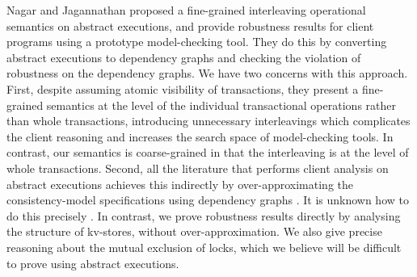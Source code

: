 {%

Nagar and Jagannathan \cite{sureshConcur} proposed a fine-grained 
interleaving operational semantics on abstract executions, and provide
robustness results for client programs using 
a prototype 
model-checking tool. 
They do this by converting abstract executions to
dependency graphs and checking the violation of robustness on the
dependency graphs. We have two concerns with this approach.  First, despite 
assuming atomic visibility of transactions, they present a fine-grained
semantics at the level of the individual transactional operations
rather than whole transactions, introducing unnecessary interleavings
which complicates the client reasoning and increases  the
search space of model-checking tools. 
In contrast, our semantics is coarse-grained in that the  interleaving is at the level of whole
transactions. 
Second, all the literature that performs client analysis
on abstract executions achieves this indirectly by over-approximating
the consistency-model specifications using dependency graphs
\cite{giovanni_concur16,SIanalysis,psi-chopping,laws,sureshConcur}. 
It is  unknown how to do this precisely \cite{laws}. 
In contrast, we prove robustness results directly by
analysing the structure of kv-stores, without over-approximation. 
We also give precise reasoning about the mutual exclusion of locks,
which we believe will be difficult to prove using abstract executions.


}
